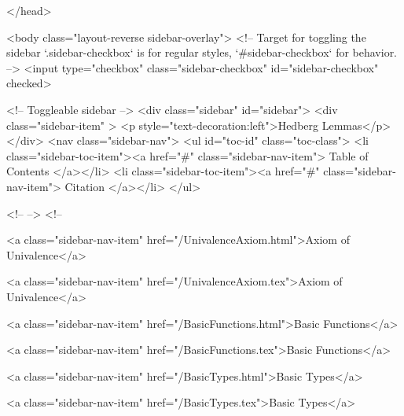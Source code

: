   
</head>




  <body class="layout-reverse sidebar-overlay">
    <!-- Target for toggling the sidebar `.sidebar-checkbox` is for regular
     styles, `#sidebar-checkbox` for behavior. -->
<input type="checkbox" class="sidebar-checkbox" id="sidebar-checkbox" checked>

<!-- Toggleable sidebar -->
<div class="sidebar" id="sidebar">
  <div class="sidebar-item" >
    <p style="text-decoration:left">Hedberg Lemmas</p>
  </div>
  <nav class="sidebar-nav">
    <ul id="toc-id" class="toc-class">
  <li class="sidebar-toc-item"><a href="#" class="sidebar-nav-item"> Table of Contents </a></li>
  <li class="sidebar-toc-item"><a href="#" class="sidebar-nav-item"> Citation </a></li>
</ul>


    <!--  -->
    <!-- 
      
    
      
    
      
    
      
        
      
    
      
        
          <a class="sidebar-nav-item" href="/UnivalenceAxiom.html">Axiom of Univalence</a>
        
      
    
      
        
          <a class="sidebar-nav-item" href="/UnivalenceAxiom.tex">Axiom of Univalence</a>
        
      
    
      
        
          <a class="sidebar-nav-item" href="/BasicFunctions.html">Basic Functions</a>
        
      
    
      
        
          <a class="sidebar-nav-item" href="/BasicFunctions.tex">Basic Functions</a>
        
      
    
      
        
          <a class="sidebar-nav-item" href="/BasicTypes.html">Basic Types</a>
        
      
    
      
        
          <a class="sidebar-nav-item" href="/BasicTypes.tex">Basic Types</a>
        
      
    
      
        
